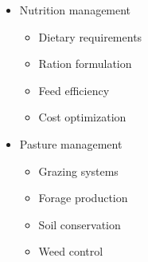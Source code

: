 \begin{itemize}
\begin{itemize}
        \item Nutrition management
        \begin{itemize}
            \item Dietary requirements
            \item Ration formulation
            \item Feed efficiency
            \item Cost optimization
        \end{itemize}
        
        \item Pasture management
        \begin{itemize}
            \item Grazing systems
            \item Forage production
            \item Soil conservation
            \item Weed control
        \end{itemize}
    \end{itemize}
\end{itemize}

